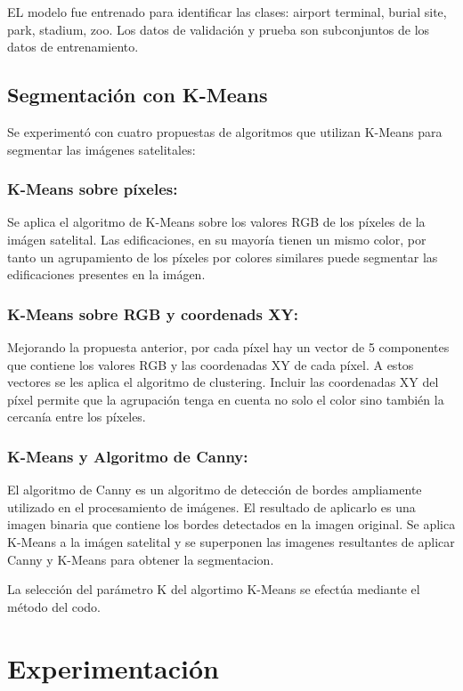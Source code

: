 \documentclass[article]{llncs}
\begin{document}
EL modelo fue entrenado para identificar las clases: airport terminal, burial site, park, stadium, zoo. Los datos de validaci\'on y prueba 
son subconjuntos de los datos de entrenamiento.

\subsection{Segmentaci\'on con K-Means}

Se experiment\'o con cuatro propuestas de algoritmos que utilizan K-Means para segmentar las im\'agenes satelitales:

\subsubsection{K-Means sobre p\'ixeles:}
Se aplica el algoritmo de K-Means sobre los valores RGB de los p\'ixeles de la im\'agen satelital. Las edificaciones, 
en su mayor\'ia tienen un mismo color, por tanto un agrupamiento de los p\'ixeles por colores similares puede segmentar 
las edificaciones presentes en la im\'agen.

\subsubsection{K-Means sobre RGB y coordenads XY:}
Mejorando la propuesta anterior, por cada p\'ixel hay un vector de 5 componentes 
que contiene los valores RGB y las coordenadas XY de cada p\'ixel. A estos vectores se les aplica el algoritmo de clustering. Incluir 
las coordenadas XY del p\'ixel permite que la agrupaci\'on tenga en cuenta no solo el color sino también la cercan\'ia 
entre los p\'ixeles. 

\subsubsection{K-Means y Algoritmo de Canny:}
El algoritmo de Canny es un algoritmo de detección de bordes ampliamente utilizado en el procesamiento de imágenes. 
El resultado de aplicarlo es una imagen binaria que contiene los bordes detectados en la imagen original. Se aplica 
K-Means a la im\'agen satelital y se superponen las imagenes resultantes de aplicar Canny y K-Means para obtener la segmentacion.

La selecci\'on del par\'ametro K del algortimo K-Means se efect\'ua mediante el m\'etodo del codo. 

\section{Experimentaci\'on}
\end{document}
